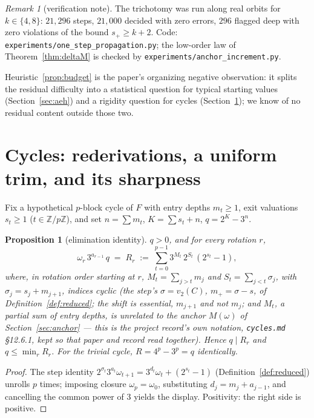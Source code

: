 \documentclass[11pt]{article}
\newtheorem{proposition}[theorem]{Proposition}
\theoremstyle{remark}
\newtheorem{remark}[theorem]{Remark}
\newcommand{\Z}{\mathbb{Z}}
\newcommand{\vt}[1]{v_2\!\left(#1\right)}
\newcommand{\w}{\omega}
\begin{document}
\begin{remark}[verification note]
The trichotomy was run along real orbits for $k \in \{4,8\}$: $21{,}296$ steps, $21{,}000$ decided with zero errors, $296$ flagged deep with zero violations of the bound $s_+ \ge k+2$. Code: \texttt{experiments/one\_step\_propagation.py}; the low-order law of Theorem~\ref{thm:deltaM} is checked by \texttt{experiments/anchor\_increment.py}.
\end{remark}

Heuristic~\ref{prop:budget} is the paper's organizing negative observation: it splits the residual difficulty into a statistical question for typical starting values (Section~\ref{sec:aeh}) and a rigidity question for cycles (Section~\ref{sec:cycles}); we know of no residual content outside those two.

\section{Cycles: rederivations, a uniform trim, and its sharpness}\label{sec:cycles}

Fix a hypothetical $p$-block cycle of $F$ with entry depths $m_t \ge 1$, exit valuations $s_t \ge 1$ ($t \in \Z/p\Z$), and set $n = \sum m_t$, $K = \sum s_t + n$, $q = 2^K - 3^n$.

\begin{proposition}[elimination identity]\label{prop:elim}
$q > 0$, and for every rotation $r$,
\[ \w_r\, 3^{a_{r-1}}\, q \;=\; R_r \;:=\; \sum_{t=0}^{p-1} 3^{M_t}\, 2^{S_t}\,(2^{s_t}-1), \]
where, in rotation order starting at $r$, $M_t = \sum_{j>t} m_j$ and $S_t = \sum_{j<t}\sigma_j$, with $\sigma_j = s_j + m_{j+1}$, indices cyclic (the step's $\sigma = \vt{C}$, $m_+ = \sigma - s$, of Definition~\ref{def:reduced}; the shift is essential, $m_{j+1}$ and not $m_j$; and $M_t$, a partial sum of entry depths, is unrelated to the anchor $M(\w)$ of Section~\ref{sec:anchor} --- this is the project record's own notation, \texttt{cycles.md} \S12.6.1, kept so that paper and record read together). Hence $q \mid R_r$ and $q \le \min_r R_r$. For the trivial cycle, $R = 4^p - 3^p = q$ identically.
\end{proposition}

\begin{proof}
The step identity $2^{\sigma_t}3^{a_t}\w_{t+1} = 3^{d_t}\w_t + (2^{s_t}-1)$ (Definition~\ref{def:reduced}) unrolls $p$ times; imposing closure $\w_p = \w_0$, substituting $d_j = m_j + a_{j-1}$, and cancelling the common power of $3$ yields the display. Positivity: the right side is positive.
\end{proof}
\end{document}

